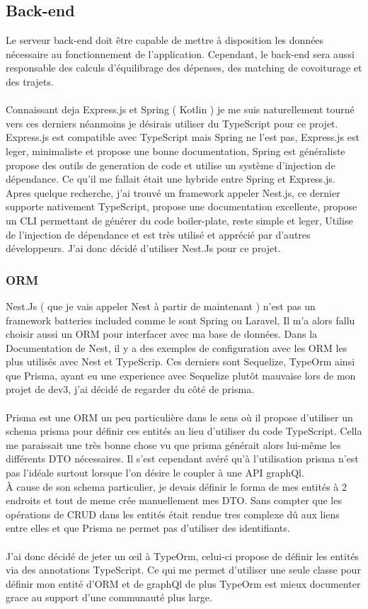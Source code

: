 \subsection{Back-end}\label{subsec:back-end}
Le serveur back-end doit être capable de mettre à disposition les données nécessaire au fonctionnement de l'application.
Cependant, le back-end sera aussi responsable des calculs d'équilibrage des dépenses, des matching de covoiturage et des trajets.\\\\
Connaissant deja Express.js et Spring ( Kotlin ) je me suis naturellement tourné vers ces derniers néanmoins je désirais utiliser du TypeScript pour ce projet.
Express.js est compatible avec TypeScript mais Spring ne l'est pas, Express.js est leger, minimaliste et propose une bonne documentation,
Spring est généraliste propose des outils de generation de code et utilise un système d'injection de dépendance.
Ce qu'il me fallait était une hybride entre Spring et Express.js.
Apres quelque recherche, j'ai trouvé un framework appeler Nest.js, ce dernier supporte nativement TypeScript, propose une documentation excellente,
propose un CLI permettant de générer du code boiler-plate, reste simple et leger, Utilise de l'injection de dépendance et est très utilisé et apprécié par d'autres développeurs.
J'ai donc décidé d'utiliser Nest.Js pour ce projet.

\subsubsection{ORM}
Nest.Js ( que je vais appeler Nest à partir de maintenant ) n'est pas un framework batteries included comme le sont Spring ou Laravel,
Il m'a alors fallu choisir aussi un ORM pour interfacer avec ma base de données.
Dans la Documentation de Nest, il y a des exemples de configuration avec les ORM les plus utilisés avec Nest et TypeScrip.
Ces derniers sont Sequelize, TypeOrm ainsi que Prisma,
ayant eu une experience avec Sequelize plutôt mauvaise lors de mon projet de dev3, j'ai décidé de regarder du côté de prisma.\\\\
Prisma est une ORM un peu particulière dans le sens où il propose d'utiliser un schema prisma pour définir ces entités au lieu d'utiliser du code TypeScript.
Cella me paraissait une très bonne chose vu que prisma générait alors lui-même les différents DTO nécessaires.
Il s'est cependant avéré qu'à l'utilisation prisma n'est pas l'idéale surtout lorsque l'on désire le coupler à une API graphQl.\\
À cause de son schema particulier, je devais définir le forma de mes entités à 2 endroits et tout de meme crée manuellement mes DTO\@.
Sans compter que les opérations de CRUD dans les entités était rendue tres complexe dû aux liens entre elles et que Prisma ne permet pas d'utiliser des identifiants.\\\\
J'ai donc décidé de jeter un œil à TypeOrm, celui-ci propose de définir les entités via des annotations TypeScript.
Ce qui me permet d'utiliser une seule classe pour définir mon entité d'ORM et de graphQl de plus TypeOrm est mieux
documenter grace au support d'une communauté plus large.


